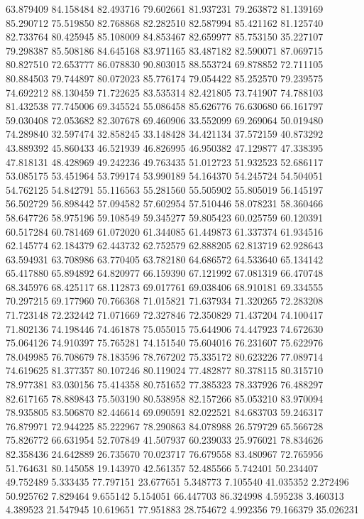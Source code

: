 63.879409
84.158484
82.493716
79.602661
81.937231
79.263872
81.139169
85.290712
75.519850
82.768868
82.282510
82.587994
85.421162
81.125740
82.733764
80.425945
85.108009
84.853467
82.659977
85.753150
35.227107
79.298387
85.508186
84.645168
83.971165
83.487182
82.590071
87.069715
80.827510
72.653777
86.078830
90.803015
88.553724
69.878852
72.711105
80.884503
79.744897
80.072023
85.776174
79.054422
85.252570
79.239575
74.692212
88.130459
71.722625
83.535314
82.421805
73.741907
74.788103
81.432538
77.745006
69.345524
55.086458
85.626776
76.630680
66.161797
59.030408
72.053682
82.307678
69.460906
33.552099
69.269064
50.019480
74.289840
32.597474
32.858245
33.148428
34.421134
37.572159
40.873292
43.889392
45.860433
46.521939
46.826995
46.950382
47.129877
47.338395
47.818131
48.428969
49.242236
49.763435
51.012723
51.932523
52.686117
53.085175
53.451964
53.799174
53.990189
54.164370
54.245724
54.504051
54.762125
54.842791
55.116563
55.281560
55.505902
55.805019
56.145197
56.502729
56.898442
57.094582
57.602954
57.510446
58.078231
58.360466
58.647726
58.975196
59.108549
59.345277
59.805423
60.025759
60.120391
60.517284
60.781469
61.072020
61.344085
61.449873
61.337374
61.934516
62.145774
62.184379
62.443732
62.752579
62.888205
62.813719
62.928643
63.594931
63.708986
63.770405
63.782180
64.686572
64.533640
65.134142
65.417880
65.894892
64.820977
66.159390
67.121992
67.081319
66.470748
68.345976
68.425117
68.112873
69.017761
69.038406
68.910181
69.334555
70.297215
69.177960
70.766368
71.015821
71.637934
71.320265
72.283208
71.723148
72.232442
71.071669
72.327846
72.350829
71.437204
74.100417
71.802136
74.198446
74.461878
75.055015
75.644906
74.447923
74.672630
75.064126
74.910397
75.765281
74.151540
75.604016
76.231607
75.622976
78.049985
76.708679
78.183596
78.767202
75.335172
80.623226
77.089714
74.619625
81.377357
80.107246
80.119024
77.482877
80.378115
80.315710
78.977381
83.030156
75.414358
80.751652
77.385323
78.337926
76.488297
82.617165
78.889843
75.503190
80.538958
82.157266
85.053210
83.970094
78.935805
83.506870
82.446614
69.090591
82.022521
84.683703
59.246317
76.879971
72.944225
85.222967
78.290863
84.078988
26.579729
65.566728
75.826772
66.631954
52.707849
41.507937
60.239033
25.976021
78.834626
82.358436
24.642889
26.735670
70.023717
76.679558
83.480967
72.765956
51.764631
80.145058
19.143970
42.561357
52.485566
5.742401
50.234407
49.752489
5.333435
77.797151
23.677651
5.348773
7.105540
41.035352
2.272496
50.925762
7.829464
9.655142
5.154051
66.447703
86.324998
4.595238
3.460313
4.389523
21.547945
10.619651
77.951883
28.754672
4.992356
79.166379
35.026231
